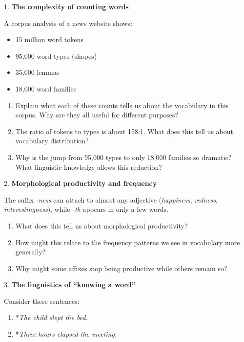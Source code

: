 \begin{tcolorbox}[title=Advanced Exercises, colback=white, colframe=red!75!black, fonttitle=\bfseries, breakable]
1. \textbf{The complexity of counting words}
 
 A corpus analysis of a news website shows:
 \begin{itemize}[nosep]
 \item 15 million word tokens
 \item 95,000 word types (shapes)
 \item 35,000 lemmas
 \item 18,000 word families
 \end{itemize}
 
 \begin{enumerate}[nosep]
 \item Explain what each of these counts tells us about the vocabulary in this corpus. Why are they all useful for different purposes?
 \item The ratio of tokens to types is about 158:1. What does this tell us about vocabulary distribution?
 \item Why is the jump from 95,000 types to only 18,000 families so dramatic? What linguistic knowledge allows this reduction?
 \end{enumerate}

2. \textbf{Morphological productivity and frequency}
 
 The suffix \textit{-ness} can attach to almost any adjective (\textit{happiness}, \textit{redness}, \textit{interestingness}), while \textit{-th} appears in only a few words.
 \begin{enumerate}[nosep]
 \item What does this tell us about morphological productivity?
 \item How might this relate to the frequency patterns we see in vocabulary more generally?
 \item Why might some affixes stop being productive while others remain so?
 \end{enumerate}

3. \textbf{The linguistics of ``knowing a word''}
 
 Consider these sentences:
 \begin{enumerate}[nosep]
 \item *\textit{The child slept the bed.}
 \item *\textit{Three hours elapsed the meeting.}
 \end{enumerate}
 

\end{tcolorbox}
